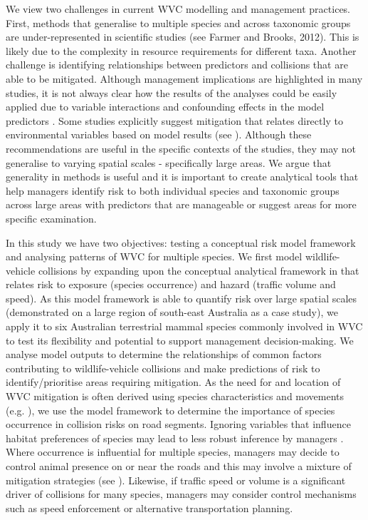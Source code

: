 We view two challenges in current WVC modelling and management practices.  First, methods that generalise to multiple species and across taxonomic groups are under-represented in scientific studies (see Farmer and Brooks, 2012).  This is likely due to the complexity in resource requirements for different taxa.  Another challenge is identifying relationships between predictors and collisions that are able to be mitigated.  Although management implications are highlighted in many studies, it is not always clear how the results of the analyses could be easily applied due to variable interactions and confounding effects in the model predictors \citep{guns11}.  Some studies explicitly suggest mitigation that relates directly to environmental variables based on model results (see \cite{gril09}).  Although these recommendations are useful in the specific contexts of the studies, they may not generalise to varying spatial scales - specifically large areas. We argue that generality in methods is useful and it is important to create analytical tools that help managers identify risk to both individual species and taxonomic groups across large areas with predictors that are manageable or suggest areas for more specific examination.

In this study we have two objectives: testing a conceptual risk model framework and analysing patterns of WVC for multiple species.  We first model wildlife-vehicle collisions by expanding upon the conceptual analytical framework in  that relates risk to exposure (species occurrence) and hazard (traffic volume and speed).  As this model framework is able to quantify risk over large spatial scales (demonstrated on a large region of south-east Australia as a case study), we apply it to six Australian terrestrial mammal species commonly involved in WVC to test its flexibility and potential to support management decision-making.  We analyse model outputs to determine the relationships of common factors contributing to wildlife-vehicle collisions and make predictions of risk to identify/prioritise areas requiring mitigation.  As the need for and location of WVC mitigation is often derived using species characteristics and movements (e.g. \cite{clev02}), we use the model framework to determine the importance of species occurrence in collision risks on road segments.  Ignoring variables that influence habitat preferences of species may lead to less robust inference by managers \citep{roge09}.  Where occurrence is influential for multiple species, managers may decide to control animal presence on or near the roads and this may involve a mixture of mitigation strategies (see \cite{beck10}).  Likewise, if traffic speed or volume is a significant driver of collisions for many species, managers may consider control mechanisms such as speed enforcement or alternative transportation planning.

